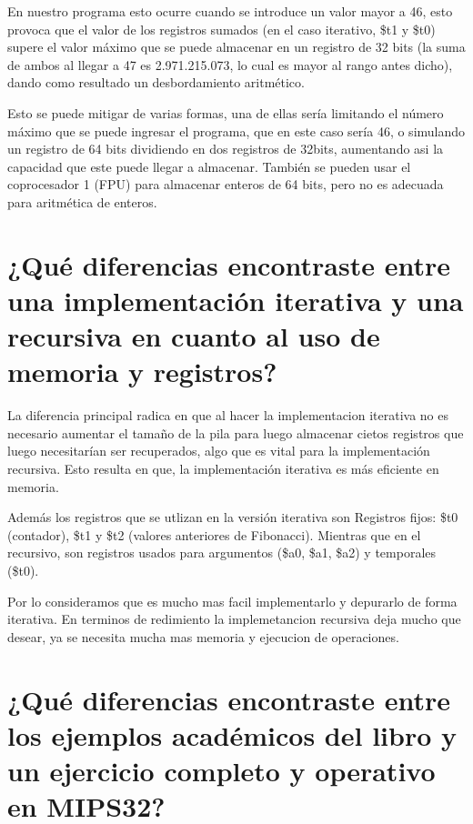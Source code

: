 \documentclass{article}
\begin{document}
En nuestro programa esto ocurre cuando se introduce un valor mayor a 46, esto provoca que el valor de los registros sumados (en el caso iterativo, \$t1 y \$t0) supere el valor máximo que se puede almacenar en un registro de 32 bits (la suma de ambos al llegar a 47 es 2.971.215.073, lo cual es mayor al rango antes dicho), dando como resultado un desbordamiento aritmético.\newline

Esto se puede mitigar de varias formas, una de ellas sería limitando el número máximo que se puede ingresar el programa, que en este caso sería 46, o simulando un registro de 64 bits dividiendo en dos registros de 32bits, aumentando asi la capacidad que este puede llegar a almacenar. También se pueden usar el coprocesador 1 (FPU) para almacenar enteros de 64 bits, pero no es adecuada para aritmética de enteros.

\section{¿Qué diferencias encontraste entre una implementación iterativa y una recursiva en cuanto al uso de memoria y registros?}

La diferencia principal radica en que al hacer la implementacion iterativa no es necesario aumentar el tamaño de la pila para luego almacenar cietos registros que luego necesitarían ser recuperados, algo que es vital para la implementación recursiva. Esto resulta en que, la implementación iterativa es más eficiente en memoria. \newline

Además los registros que se utlizan en la versión iterativa son Registros fijos: \$t0 (contador), \$t1 y \$t2 (valores anteriores de Fibonacci). Mientras que en el recursivo, son registros usados para argumentos (\$a0, \$a1, \$a2) y temporales (\$t0).\newline

Por lo consideramos que es mucho mas facil implementarlo y depurarlo de forma iterativa. En terminos de redimiento la implemetancion recursiva deja mucho que desear, ya se necesita mucha mas memoria y ejecucion de operaciones.
\newpage

\section{¿Qué diferencias encontraste entre los ejemplos académicos del libro y un ejercicio completo y operativo en MIPS32?}
\end{document}
